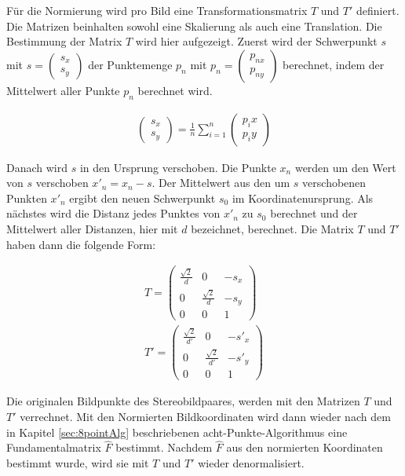 Für die Normierung wird pro Bild eine Transformationsmatrix $T$ und $T'$ definiert. Die Matrizen beinhalten sowohl eine Skalierung als auch eine Translation. Die Bestimmung der Matrix $T$ wird hier aufgezeigt. Zuerst wird der Schwerpunkt $s$ mit $s=\begin{pmatrix}
s_x\\
s_y
\end{pmatrix}$ der Punktemenge $p_n$ mit $p_n = \begin{pmatrix}
p_{nx}\\
p_{ny}
\end{pmatrix}$ berechnet, indem der Mittelwert aller Punkte $p_n$ berechnet wird.

\begin{gather}
	\begin{pmatrix}
		s_x\\
		s_y
	\end{pmatrix} = \frac{1}{n} \sum_{i = 1}^{n} \begin{pmatrix}
	p_ix\\
	p_iy
\end{pmatrix}
\end{gather}

Danach wird $s$ in den Ursprung verschoben. Die Punkte $x_n$ werden um den Wert von $s$ verschoben $x'_n = x_n - s$. Der Mittelwert aus den um $s$ verschobenen Punkten $x'_n$ ergibt den neuen Schwerpunkt $s_0$ im Koordinatenursprung. Als nächstes wird die Distanz jedes Punktes von $x'_n$ zu $s_0$ berechnet und der Mittelwert aller Distanzen, hier mit $d$ bezeichnet, berechnet. Die Matrix $T$ und $T'$ haben dann die folgende Form:

\begin{gather}
	T = \begin{pmatrix}
		\frac{\sqrt{2}}{d}&0&-s_x\\
		0&\frac{\sqrt{2}}{d}&-s_y\\
		0&0&1
	\end{pmatrix}\\
	T' = \begin{pmatrix}
	\frac{\sqrt{2}}{d'}&0&-s'_x\\
	0&\frac{\sqrt{2}}{d'}&-s'_y\\
	0&0&1
\end{pmatrix}
\end{gather}

Die originalen Bildpunkte des Stereobildpaares, werden mit den Matrizen $T$ und $T'$ verrechnet. Mit den Normierten Bildkoordinaten wird dann wieder nach dem in Kapitel \ref{sec:8pointAlg} beschriebenen acht-Punkte-Algorithmus eine Fundamentalmatrix $\hat{F}$ bestimmt\cite{HZ,HZ8,Ferid,Brooks}. Nachdem $\hat{F}$ aus den normierten Koordinaten bestimmt wurde, wird sie mit $T$ und $T'$ wieder denormalisiert.

